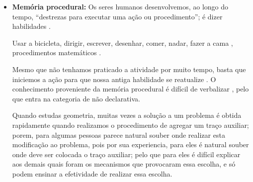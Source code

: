 \begin{itemize}
\item \textbf{Memória procedural:}
\label{reflab:memprocedural}
Os seres humanos desenvolvemos, ao longo do tempo, ``destrezas para executar uma ação ou procedimento'';
é dizer habilidades
\cite[pp. 140]{pake2019psicologia} \cite[pp. 36]{de2000comprension}.
\begin{example}
Usar a bicicleta, dirigir, escrever, desenhar, comer, nadar, fazer a cama \cite[pp. 36]{de2000comprension},
procedimentos matemáticos \cite{evans2016extension} \cite{davis2000memory}.
\end{example}
Mesmo que não tenhamos praticado a atividade por muito tempo, 
basta que iniciemos a ação para que nossa antiga habilidade se reatualize 
\cite[pp. 36]{de2000comprension}.
O conhecimento proveniente da memória procedural é difícil de verbalizar
\cite[pp. 36]{de2000comprension}, pelo que entra na categoria de não declarativa.
\begin{example}
Quando estudas geometria, 
muitas vezes a solução a um problema é obtida rapidamente quando realizamos o procedimento de agregar um traço auxiliar;
porem, para algumas pessoas parece natural souber onde realizar esta modificação ao problema,
pois por sua experiencia, para eles é natural souber onde deve ser colocada o traço auxiliar;
pelo que para eles é difícil explicar aos demais quais foram os mecanismos que provocaram essa escolha,
e só podem ensinar a efetividade de realizar essa escolha.


\end{example}
\end{itemize}
